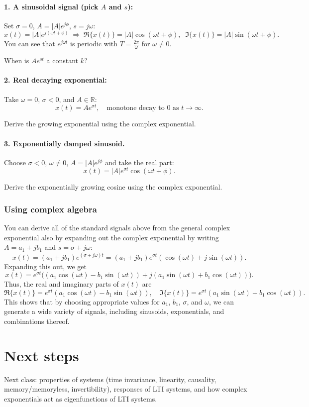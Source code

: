 \documentclass{ee102_notes}
\begin{document}
\paragraph{1. A sinusoidal signal (pick $A$ and $s$):}
Set $\sigma=0$, $A=|A|e^{j\phi}$, $s=j\omega$:
\[
x(t) = |A|e^{j(\omega t+\phi)} \;\Rightarrow\;
\Re\{x(t)\} = |A|\cos(\omega t+\phi),\;\; \Im\{x(t)\}=|A|\sin(\omega t+\phi).
\]
You can see that $e^{j\omega t}$ is periodic with $T=\tfrac{2\pi}{\omega}$ for $\omega\neq 0$.

\begin{popquiz} When is $A e^{s t}$ a constant $k$?
\end{popquiz}
\paragraph{2. Real decaying exponential:}
Take $\omega=0$, $\sigma<0$, and $A\in\mathbb{R}$:
\[
x(t)=A e^{\sigma t},\quad \text{monotone decay to $0$ as $t\to\infty$.}
\]
\begin{popquiz} Derive the growing exponential using the complex exponential.
\end{popquiz}

\paragraph{3. Exponentially damped sinusoid.}
Choose $\sigma<0$, $\omega\neq 0$, $A=|A|e^{j\phi}$ and take the real part:
\[
x(t)=|A|e^{\sigma t}\cos(\omega t+\phi).
\]
\begin{popquiz} Derive the exponentially growing cosine using the complex exponential.
\end{popquiz}
\subsubsection{Using complex algebra}
You can derive all of the standard signals above from the general complex exponential also by expanding out the complex exponential by writing $A = a_1 + j b_1$ and $s = \sigma + j\omega$:
\[
x(t) = (a_1 + j b_1) e^{(\sigma + j\omega) t} = (a_1 + j b_1) e^{\sigma t} (\cos(\omega t) + j \sin(\omega t)).
\]
Expanding this out, we get
\[
x(t) = e^{\sigma t} \big( (a_1 \cos(\omega t) - b_1 \sin(\omega t)) + j (a_1 \sin(\omega t) + b_1 \cos(\omega t)) \big).
\]
Thus, the real and imaginary parts of $x(t)$ are
\[
\Re\{x(t)\} = e^{\sigma t} (a_1 \cos(\omega t) - b_1 \sin(\omega t)), \quad \Im\{x(t)\} = e^{\sigma t} (a_1 \sin(\omega t) + b_1 \cos(\omega t)).
\]
This shows that by choosing appropriate values for $a_1$, $b_1$, $\sigma$, and $\omega$, we can generate a wide variety of signals, including sinusoids, exponentials, and combinations thereof.
\section*{Next steps}
Next class: properties of systems (time invariance, linearity, causality, memory/memoryless, invertibility), responses of LTI systems, and how complex exponentials act as eigenfunctions of LTI systems.
\end{document}
